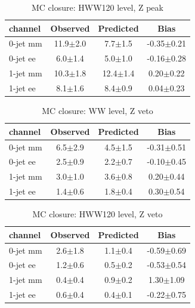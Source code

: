 \begin{table}[!hbtp]
{
 \begin{center}
 \begin{tabular}{l | c c c}
 \hline
channel       & Observed & Predicted & Bias \\
 \hline
0-jet  mm &   11.9$\pm$2.0      &    7.7$\pm$1.5      &  -0.35$\pm$0.21  \\
0-jet  ee &    6.0$\pm$1.4      &    5.0$\pm$1.0      &  -0.16$\pm$0.28  \\
 \hline
1-jet  mm &   10.3$\pm$1.8      &   12.4$\pm$1.4      &   0.20$\pm$0.22  \\
1-jet  ee &    8.1$\pm$1.6      &    8.4$\pm$0.9      &   0.04$\pm$0.23  \\
 \hline
\end{tabular}
\end{center}
}
\caption{MC closure: HWW120 level, Z peak}
\label{tab:zeta:mccloseHWWzv}
\end{table}

\begin{table}[!hbtp]
{
 \begin{center}
 \begin{tabular}{l | c c c}
 \hline
channel       & Observed & Predicted & Bias \\
 \hline
0-jet  mm &    6.5$\pm$2.9      &    4.5$\pm$1.5      &  -0.31$\pm$0.51  \\
0-jet  ee &    2.5$\pm$0.9      &    2.2$\pm$0.7      &  -0.10$\pm$0.45  \\
 \hline
1-jet  mm &    3.0$\pm$1.0      &    3.6$\pm$0.8      &   0.20$\pm$0.44  \\
1-jet  ee &    1.4$\pm$0.6      &    1.8$\pm$0.4      &   0.30$\pm$0.54  \\
 \hline
\end{tabular}
\end{center}
}
\caption{MC closure: WW level, Z veto}
\label{tab:zeta:mccloseWWzv}
\end{table}

\begin{table}[!hbtp]
{
 \begin{center}
 \begin{tabular}{l | c c c}
 \hline
channel       & Observed & Predicted & Bias \\
 \hline
0-jet  mm &    2.6$\pm$1.8      &    1.1$\pm$0.4      &  -0.59$\pm$0.69  \\
0-jet  ee &    1.2$\pm$0.6      &    0.5$\pm$0.2      &  -0.53$\pm$0.54  \\
 \hline
1-jet  mm &    0.4$\pm$0.4      &    0.9$\pm$0.2      &   1.30$\pm$1.09  \\
1-jet  ee &    0.6$\pm$0.4      &    0.4$\pm$0.1      &  -0.22$\pm$0.75  \\
 \hline
\end{tabular}
\end{center}
}
\caption{MC closure: HWW120 level, Z veto}
\label{tab:zeta:mccloseHWWzv}
\end{table}

